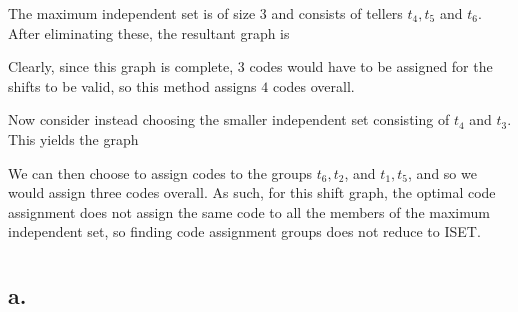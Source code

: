\documentclass[11pt]{article}
\begin{document}
 The maximum independent set is of size $3$ and consists of tellers $t_4, t_5$ and $t_6$. After eliminating these, the resultant graph is 
 \begin{figure}[H]
    \centering
 \end{figure}
 Clearly, since this graph is complete, $3$ codes would have to be assigned for the shifts to be valid, so this method assigns $4$ codes overall.

 Now consider instead choosing the smaller independent set consisting of $t_4$ and $t_3$. This yields the graph
 \begin{figure}[H]
    \centering
 \end{figure}
 We can then choose to assign codes to the groups $t_6, t_2$, and $t_1, t_5$, and so we would assign three codes overall. As such, for this shift graph, the optimal code assignment does not assign the same code to all the members of the maximum independent set, so finding code assignment groups does not reduce to ISET.


\section{}
\subsection*{a.}
\end{document}
